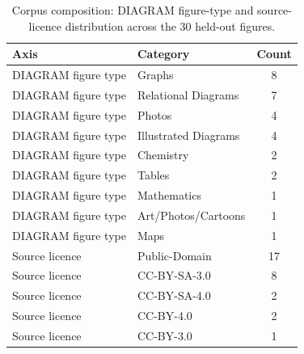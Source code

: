 \setlength{\heavyrulewidth}{1.0pt}
\setlength{\lightrulewidth}{0.5pt}
\setlength{\arrayrulewidth}{0.5pt}
\setlength{\aboverulesep}{0pt}
\setlength{\belowrulesep}{0pt}
\begin{table}[htbp]
\centering
\caption{Corpus composition: DIAGRAM figure-type and source-licence distribution across the 30 held-out figures.}
\label{tab:composition}
\begin{tabular}{llc}
\toprule
Axis & Category & Count \\
\midrule
DIAGRAM figure type & Graphs & 8 \\
DIAGRAM figure type & Relational Diagrams & 7 \\
DIAGRAM figure type & Photos & 4 \\
DIAGRAM figure type & Illustrated Diagrams & 4 \\
DIAGRAM figure type & Chemistry & 2 \\
DIAGRAM figure type & Tables & 2 \\
DIAGRAM figure type & Mathematics & 1 \\
DIAGRAM figure type & Art/Photos/Cartoons & 1 \\
DIAGRAM figure type & Maps & 1 \\
Source licence & Public-Domain & 17 \\
Source licence & CC-BY-SA-3.0 & 8 \\
Source licence & CC-BY-SA-4.0 & 2 \\
Source licence & CC-BY-4.0 & 2 \\
Source licence & CC-BY-3.0 & 1 \\
\bottomrule
\end{tabular}
\end{table}

